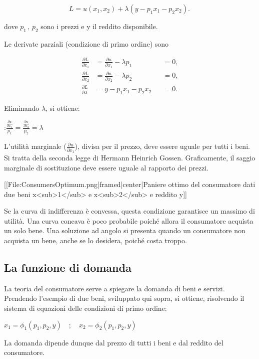 \[ L = u(x_1,x_2) + \lambda ( y - p_1 x_1 - p_2 x_2). \, \]

dove \( p_1 \, , \, p_2 \) sono i prezzi e y il reddito disponibile.

Le derivate parziali (condizione di primo ordine) sono

\begin{align}
\frac{\partial L}{\partial x_1}       &= {\frac{\partial u}{\partial x_1}} -  
\lambda p_1 &&= 0, \\
\frac{\partial L}{\partial x_2}       &= {\frac{\partial u}{\partial x_2}} - 
\lambda p_2   &&= 0,  \\
\frac{\partial L}{\partial \lambda} &= y - p_1 x_1 - p_2 x_2       &&= 0. 
\end{align}

Eliminando \(\lambda\), si ottiene:

:\( \frac{\frac{\partial u}{\partial x_1}}{p_1} =  \frac{\frac{\partial 
u}{\partial x_2}}{p_2}= \lambda \)

L'utilità marginale (\( \frac{\partial u}{\partial x_1}\)), divisa 
per il prezzo, deve essere uguale per tutti i beni. Si tratta della seconda 
legge di Hermann Heinrich Gossen. Graficamente, il saggio marginale di 
sostituzione deve essere uguale al rapporto dei prezzi.

[[File:ConsumersOptimum.png|framed|center|Paniere ottimo del consumatore dati 
due beni x<sub>1</sub> e x<sub>2</sub> e reddito y]]

Se la curva di indifferenza è convessa, questa condizione garantisce un 
massimo di utilità. Una curva concava è poco probabile poiché allora il 
consumatore acquista un solo bene. Una soluzione ad angolo si presenta quando 
un consumatore non acquista un bene, anche se lo desidera, poiché costa troppo.

\subsection{La funzione di domanda}

La teoria del consumatore serve a spiegare la domanda di beni e servizi. 
Prendendo l'esempio di due beni, sviluppato qui sopra, si ottiene, risolvendo 
il sistema di equazioni delle condizioni di primo ordine:

\(x_1 = \phi_1 (p_1, p_2, y) \quad ; \quad x_2= \phi_2 (p_1,p_2,y)\)

La domanda dipende dunque dal prezzo di tutti i beni e dal reddito del 
consumatore. 

